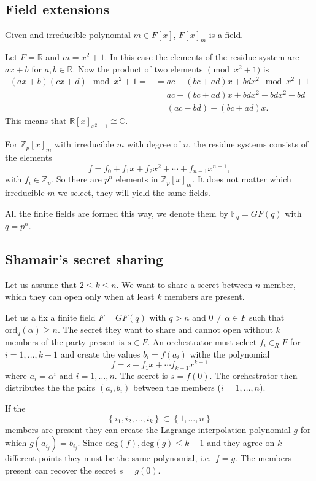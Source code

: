 \documentclass{article}
\newcommand{\Z}{\mathbb{Z}}
\begin{document}
\subsection{Field extensions}

Given and irreducible polynomial $m \in F[x]$, $F[x]_m$ is a field.

Let $F=\mathbb{R}$ and $m = x^2 + 1$. In this case the elements of the residue system are $ax+b$ for $a,b \in \mathbb{R}$.
Now the product of two elements $\pmod{x^2 + 1}$ is
\begin{align*}
    (ax + b)(cx + d) \mod x^2 + 1 = &= ac + (bc+ad)x + bdx^2 \mod x^2 + 1 \\
                                    &= ac + (bc+ad)x + bdx^2 - bdx^2 - bd \\
                                    &= (ac - bd) + (bc + ad)x.
\end{align*}
This means that $\mathbb{R}[x]_{x^2 + 1} \cong \mathbb{C}$.

For $\Z_p[x]_m$ with irreducible $m$ with degree of $n$, the residue systems consists of the elements
\[
    f = f_0 + f_1 x + f_2 x^2 + \cdots + f_{n-1} x^{n-1},
\]
with $f_i \in \Z_p$. So there are $p^n$ elements in $\Z_p[x]_m$. It does not matter which irreducible $m$ we select, they will yield the same fields.

All the finite fields are formed this way, we denote them by $\mathbb{F}_q = GF(q)$ with $q=p^n$.

\subsection{Shamair's secret sharing}

Let us assume that $2 \le k \le n$.
We want to share a secret between $n$ member, which they can open only when at least $k$ members are present.

Let us a fix a finite field $F=GF(q)$ with $q > n$ and $0 \neq \alpha \in F$ such that $\mathrm{ord}_q(\alpha) \ge n$.
The secret they want to share and cannot open without $k$ members of the party present is $s \in F$.
An orchestrator must select $f_i \in_{R} F$ for $i=1,\ldots,k-1$ and create the values $b_i = f(a_i)$ withe the polynomial
\[
    f = s + f_1 x + \cdots f_{k-1}x^{k-1}
\]
where $a_i = \alpha^{i}$ and $i=1,\ldots,n$. The secret is $s = f(0)$.
The orchestrator then distributes the the pairs $(a_i, b_i)$ between the members ($i=1,\ldots,n$).

If the
\[
    \left\{ i_1, i_2, \ldots, i_k \right\} \subset \left\{ 1,\dots,n \right\}
\]
members are present they can create the Lagrange interpolation polynomial $g$ for which $g(a_{i_j}) = b_{i_j}$.
Since $\mathrm{deg}(f), \mathrm{deg}(g) \le k-1$ and they agree on $k$ different points they must be the same polynomial, i.e.\ $f=g$.
The members present can recover the secret $s=g(0)$.
\end{document}
